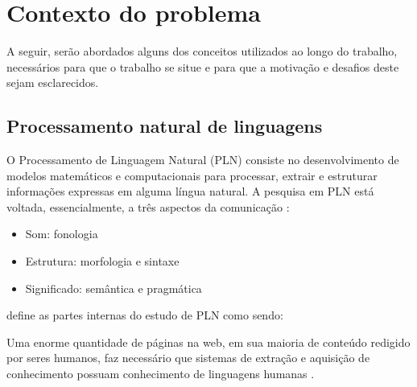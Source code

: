 \chapter{Contexto do problema} \label{c:contexto_do_problema}

A seguir, serão abordados alguns dos conceitos utilizados ao longo do trabalho, necessários para que o trabalho se situe e para que a motivação e desafios deste sejam esclarecidos.

\section{Processamento natural de linguagens} \label{s:processamento_natural_de_linguagens}

O Processamento de Linguagem Natural (PLN) consiste no desenvolvimento de modelos matemáticos e computacionais para processar, extrair e estruturar informações expressas em alguma língua natural. A pesquisa em PLN está voltada, essencialmente, a três aspectos da comunicação \cite{doprocessamento}:
\begin{itemize}
\item  Som: fonologia
\item  Estrutura: morfologia e sintaxe
\item  Significado: semântica e pragmática
\end{itemize}

 define as partes internas do estudo de PLN como sendo:

\begin{quote}
\end{quote}

Uma enorme quantidade de páginas na web, em sua maioria de conteúdo redigido por seres humanos, faz necessário que sistemas de extração e aquisição de conhecimento possuam conhecimento de linguagens humanas \cite{inteligencia-artificial}.

